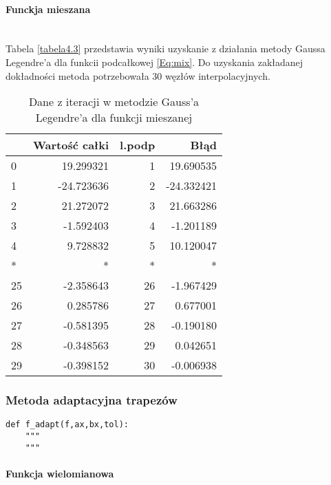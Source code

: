 \documentclass[12pt,twoside]{article}
\begin{document}
\paragraph{Funckja mieszana}\mbox{} \\

Tabela \eqref{tabela4.3} przedstawia wyniki uzyskanie z działania metody Gaussa Legendre'a dla funkcii podcałkowej \eqref{Eq:mix}.
Do uzyskania zakładanej dokładności metoda potrzebowała 30 węzłów interpolacyjnych.


\begin{table}[H]
\centering
\caption{Dane z iteracji w metodzie Gauss'a Legendre'a dla funkcji mieszanej}
\label{tabela4.3}
\begin{tabular}{lrrr}
\toprule
{} &  Wartość całki &  l.podp &       Błąd \\
\midrule
0  &      19.299321 &       1 &  19.690535 \\
1  &     -24.723636 &       2 & -24.332421 \\
2  &      21.272072 &       3 &  21.663286 \\
3  &      -1.592403 &       4 &  -1.201189 \\
4  &       9.728832 &       5 &  10.120047 \\
*   &       * &       * &   * \\
25 &      -2.358643 &      26 &  -1.967429 \\
26 &       0.285786 &      27 &   0.677001 \\
27 &      -0.581395 &      28 &  -0.190180 \\
28 &      -0.348563 &      29 &   0.042651 \\
29 &      -0.398152 &      30 &  -0.006938 \\
\bottomrule
\end{tabular}
\end{table}

\subsubsection{Metoda adaptacyjna trapezów}

\begin{lstlisting}[caption={Kod w języku python implementujący metodę trapezów}]
def f_adapt(f,ax,bx,tol):
    """
    """
\end{lstlisting}
\label{Listing 10}

\paragraph{Funkcja wielomianowa}\mbox{} \\
\end{document}
